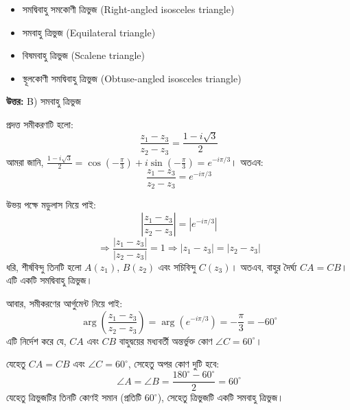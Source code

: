 \documentclass[12pt, a4paper]{article}
\begin{document}
\begin{itemize}[label={}, leftmargin=1cm, itemsep=0.5em]
    \item[\textbf{A)}] সমদ্বিবাহু সমকোণী ত্রিভুজ (Right-angled isosceles triangle)
    \item[\textbf{B)}] সমবাহু ত্রিভুজ (Equilateral triangle)
    \item[\textbf{C)}] বিষমবাহু ত্রিভুজ (Scalene triangle)
    \item[\textbf{D)}] স্থূলকোণী সমদ্বিবাহু ত্রিভুজ (Obtuse-angled isosceles triangle)
\end{itemize}

\vspace{0.5em}
\begin{tcolorbox}[answerbox]
    \textbf{\color{success} উত্তর:} B) সমবাহু ত্রিভুজ
\end{tcolorbox}
\vspace{1em}

\begin{tcolorbox}[solutionbox={সমাধান (Solution)}]
    \noindent
    প্রদত্ত সমীকরণটি হলো:
    \[ \frac{z_1 - z_3}{z_2 - z_3} = \frac{1 - i\sqrt{3}}{2} \]
    আমরা জানি, $\frac{1 - i\sqrt{3}}{2} = \cos\left(-\frac{\pi}{3}\right) + i\sin\left(-\frac{\pi}{3}\right) = e^{-i\pi/3}$। অতএব:
    \[ \frac{z_1 - z_3}{z_2 - z_3} = e^{-i\pi/3} \]
    
    \vspace{0.5em}
    উভয় পক্ষে মডুলাস নিয়ে পাই:
    \[ \left|\frac{z_1 - z_3}{z_2 - z_3}\right| = \left|e^{-i\pi/3}\right| \]
    \[ \Rightarrow \frac{|z_1 - z_3|}{|z_2 - z_3|} = 1 \Rightarrow |z_1 - z_3| = |z_2 - z_3| \]
    ধরি, শীর্ষবিন্দু তিনটি হলো $A(z_1)$, $B(z_2)$ এবং সচিবিন্দু $C(z_3)$। অতএব, বাহুর দৈর্ঘ্য $CA = CB$। এটি একটি সমদ্বিবাহু ত্রিভুজ।
    
    \vspace{0.5em}
    আবার, সমীকরণের আর্গুমেন্ট নিয়ে পাই:
    \[ \arg\left(\frac{z_1 - z_3}{z_2 - z_3}\right) = \arg(e^{-i\pi/3}) = -\frac{\pi}{3} = -60^\circ \]
    এটি নির্দেশ করে যে, $CA$ এবং $CB$ বাহুদ্বয়ের মধ্যবর্তী অন্তর্ভুক্ত কোণ $\angle C = 60^\circ$। 
    
    \vspace{0.5em}
    যেহেতু $CA = CB$ এবং $\angle C = 60^\circ$, সেহেতু অপর কোণ দুটি হবে:
    \[ \angle A = \angle B = \frac{180^\circ - 60^\circ}{2} = 60^\circ \]
    যেহেতু ত্রিভুজটির তিনটি কোণই সমান (প্রতিটি $60^\circ$), সেহেতু ত্রিভুজটি একটি সমবাহু ত্রিভুজ।
\end{tcolorbox}
\end{document}
